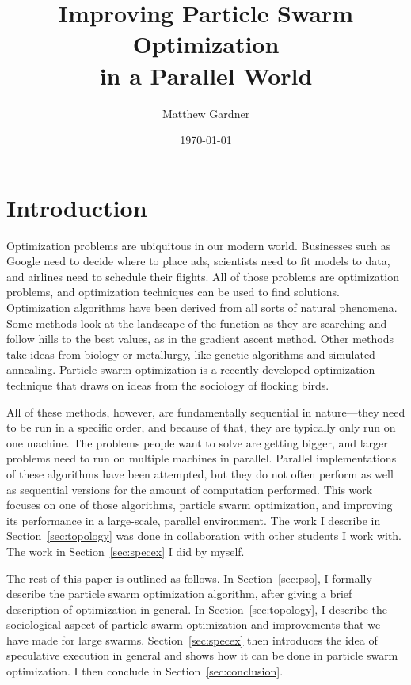\documentclass[onecolumn, 12pt]{article}
\title{Improving Particle Swarm Optimization \\ in a Parallel World}
\author{Matthew Gardner}
\date{\today}
\begin{document}
\maketitle

\section{Introduction}
\label{sec:intro}

Optimization problems are ubiquitous in our modern world.  Businesses such as
Google need to decide where to place ads, scientists need to fit models to
data, and airlines need to schedule their flights.  All of those problems are
optimization problems, and optimization techniques can be used to find
solutions.  Optimization algorithms have been derived from all sorts of natural
phenomena.  Some methods look at the landscape of the function as they are
searching and follow hills to the best values, as in the gradient ascent
method.  Other methods take ideas from biology or metallurgy, like genetic
algorithms and simulated annealing.  Particle swarm optimization is a recently
developed optimization technique that draws on ideas from the sociology of
flocking birds.  

All of these methods, however, are fundamentally sequential in nature---they
need to be run in a specific order, and because of that, they are typically
only run on one machine.  The problems people want to solve are getting bigger,
and larger problems need to run on multiple machines in parallel.  Parallel
implementations of these algorithms have been attempted, but they do not often
perform as well as sequential versions for the amount of computation performed.
This work focuses on one of those algorithms, particle swarm optimization, and
improving its performance in a large-scale, parallel environment.  The work I
describe in Section~\ref{sec:topology} was done in collaboration with other
students I work with.  The work in Section~\ref{sec:specex} I did by myself.

The rest of this paper is outlined as follows.  In Section~\ref{sec:pso}, I
formally describe the particle swarm optimization algorithm, after giving a
brief description of optimization in general.  In Section~\ref{sec:topology},
I describe the sociological aspect of particle swarm optimization and
improvements that we have made for large swarms.  Section~\ref{sec:specex} then
introduces the idea of speculative execution in general and shows how it can be
done in particle swarm optimization.  I then conclude in Section~\ref{sec:conclusion}.
\end{document}
